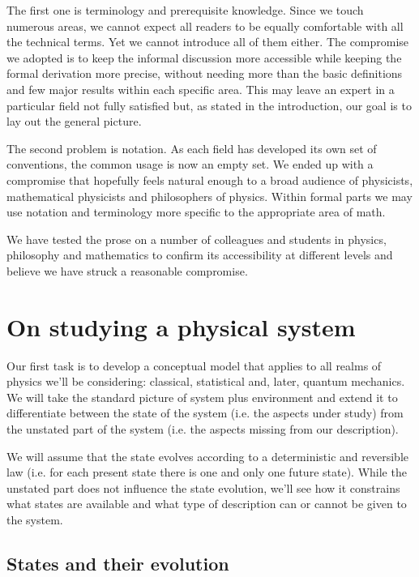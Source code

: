 \documentclass[smallextended]{svjour3}
\numberwithin{equation}{section}
\theoremstyle{definition}
\begin{document}
The first one is terminology and prerequisite knowledge. Since we touch numerous areas, we cannot expect all readers to be equally comfortable with all the technical terms. Yet we cannot introduce all of them either. The compromise we adopted is to keep the informal discussion more accessible while keeping the formal derivation more precise, without needing more than the basic definitions and few major results within each specific area. This may leave an expert in a particular field not fully satisfied but, as stated in the introduction, our goal is to lay out the general picture.

The second problem is notation. As each field has developed its own set of conventions, the common usage is now an empty set. We ended up with a compromise that hopefully feels natural enough to a broad audience of physicists, mathematical physicists and philosophers of physics. Within formal parts we may use notation and terminology more specific to the appropriate area of math.

We have tested the prose on a number of colleagues and students in physics, philosophy and mathematics to confirm its accessibility at different levels and believe we have struck a reasonable compromise.

\section{On studying a physical system}
\label{sec:fundamental_model}


Our first task is to develop a conceptual model that applies to all realms of physics we'll be considering: classical, statistical and, later, quantum mechanics. We will take the standard picture of system plus environment and extend it to differentiate between the state of the system (i.e. the aspects under study) from the unstated part of the system (i.e. the aspects missing from our description).

We will assume that the state evolves according to a deterministic and reversible law (i.e. for each present state there is one and only one future state). While the unstated part does not influence the state evolution, we'll see how it constrains what states are available and what type of description can or cannot be given to the system.

\subsection{States and their evolution}
\end{document}
